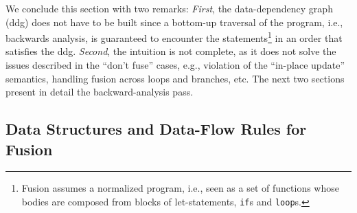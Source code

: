 \documentclass{sigplanconf}  %
\begin{document}
We conclude this section with two remarks: {\em First}, the data-dependency  %
graph ({\sc ddg}) does not have to be built since a bottom-up traversal of the program, 
i.e., backwards analysis, is guaranteed to encounter the statements\footnote{
Fusion assumes a normalized program, i.e., seen as a set of functions 
whose bodies are composed from blocks of let-statements, {\tt if}s and {\tt loop}s.
} in an order that satisfies the {\sc ddg}.
{\em Second}, the intuition is not complete, as it does not solve the 
issues described in the ``don't fuse'' cases, e.g., violation of the ``in-place update'' 
semantics, handling fusion across loops and branches, etc. 
%
The next two sections present in detail the backward-analysis pass.
  




\subsection{Data Structures and Data-Flow Rules for Fusion}
\label{sec:bwdPass}
\end{document}
